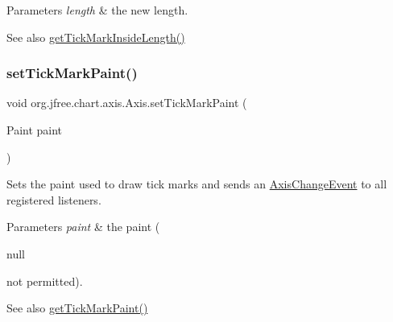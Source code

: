\begin{DoxyParams}{Parameters}
{\em length} & the new length.\\
\hline
\end{DoxyParams}
\begin{DoxySeeAlso}{See also}
\mbox{\hyperlink{classorg_1_1jfree_1_1chart_1_1axis_1_1_axis_a6148f15b99e9ba54ac3a3793e16e3110}{get\+Tick\+Mark\+Inside\+Length()}} 
\end{DoxySeeAlso}
\mbox{\label{classorg_1_1jfree_1_1chart_1_1axis_1_1_axis_a1608c6dd5ac66a80306a06faa4b65905}} 
\subsubsection{\texorpdfstring{set\+Tick\+Mark\+Paint()}{setTickMarkPaint()}}
{\footnotesize\ttfamily void org.\+jfree.\+chart.\+axis.\+Axis.\+set\+Tick\+Mark\+Paint (\begin{DoxyParamCaption}\item[{Paint}]{paint }\end{DoxyParamCaption})}

Sets the paint used to draw tick marks and sends an \mbox{\hyperlink{}{Axis\+Change\+Event}} to all registered listeners.


\begin{DoxyParams}{Parameters}
{\em paint} & the paint (
\begin{DoxyCode}
null 
\end{DoxyCode}
 not permitted).\\
\hline
\end{DoxyParams}
\begin{DoxySeeAlso}{See also}
\mbox{\hyperlink{classorg_1_1jfree_1_1chart_1_1axis_1_1_axis_a705a68f5e9e714df67c98dd2b24337e8}{get\+Tick\+Mark\+Paint()}} 
\end{DoxySeeAlso}
\mbox{\label{classorg_1_1jfree_1_1chart_1_1axis_1_1_axis_a119d5db3e19f77358279223fe3811c21}} 
